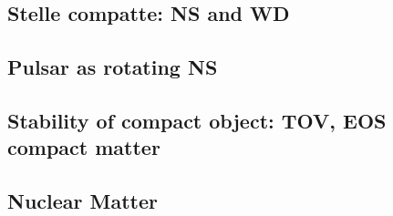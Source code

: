 
\subsection{Stelle compatte: NS and WD}

\subsection{Pulsar as rotating NS}

\subsection{Stability of compact object: TOV, EOS compact matter}

\subsection{Nuclear Matter}


